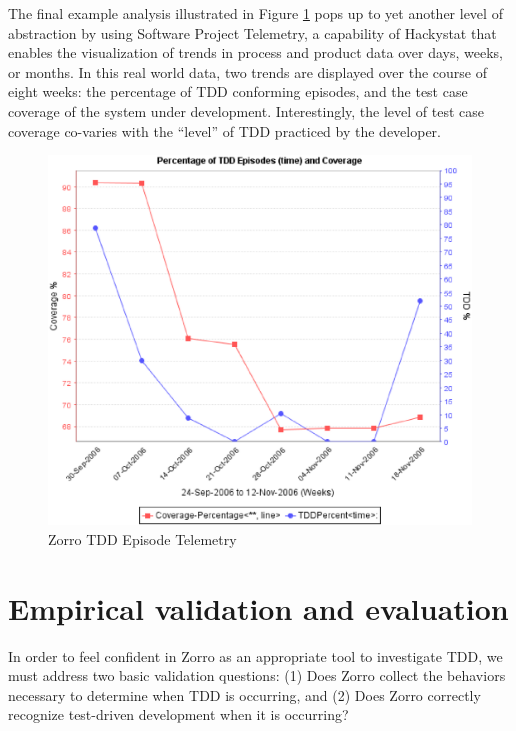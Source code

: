 \documentclass[smallextended]{svjour3}     %
\begin{document}
The final example analysis illustrated in Figure
\ref{fig:Analysis-Telemetry} pops up to yet another level of abstraction by
using Software Project Telemetry, a capability of Hackystat that enables
the visualization of trends in process and product data over days, weeks,
or months.  In this real world data, two trends are displayed over the
course of eight weeks: the percentage of TDD conforming episodes, and the
test case coverage of the system under development.  Interestingly, the
level of test case coverage co-varies with the ``level'' of TDD practiced
by the developer.

\begin{figure}[th]
  \center
  \includegraphics[width=1.0\textwidth]{zorro-tdd-coverage-2.eps}
  \caption{Zorro TDD Episode Telemetry}
  \label{fig:Analysis-Telemetry}
\end{figure} 


\section{Empirical validation and evaluation}
\label{sec:validation}

In order to feel confident in Zorro as an appropriate tool to investigate
TDD, we must address two basic validation questions: (1) Does Zorro collect
the behaviors necessary to determine when TDD is occurring, and (2) Does
Zorro correctly recognize test-driven development when it is occurring?
\end{document}
